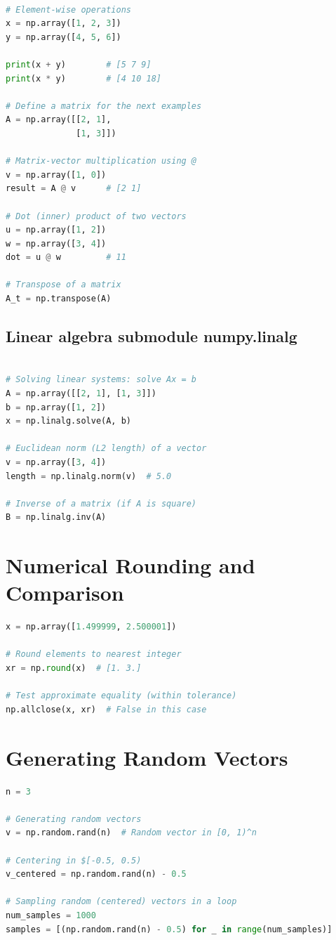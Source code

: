 \documentclass{article}
\begin{document}
\begin{lstlisting}[language=Python]

# Element-wise operations
x = np.array([1, 2, 3])
y = np.array([4, 5, 6])

print(x + y)        # [5 7 9]
print(x * y)        # [4 10 18]

# Define a matrix for the next examples
A = np.array([[2, 1], 
              [1, 3]])

# Matrix-vector multiplication using @
v = np.array([1, 0])
result = A @ v      # [2 1]

# Dot (inner) product of two vectors
u = np.array([1, 2])
w = np.array([3, 4])
dot = u @ w         # 11

# Transpose of a matrix
A_t = np.transpose(A)

\end{lstlisting}


\subsection*{Linear algebra submodule numpy.linalg}

\begin{lstlisting}[language=Python]

# Solving linear systems: solve Ax = b
A = np.array([[2, 1], [1, 3]])
b = np.array([1, 2])
x = np.linalg.solve(A, b)

# Euclidean norm (L2 length) of a vector
v = np.array([3, 4])
length = np.linalg.norm(v)  # 5.0

# Inverse of a matrix (if A is square)
B = np.linalg.inv(A)

\end{lstlisting}

\section{Numerical Rounding and Comparison}

\begin{lstlisting}[language=Python]
x = np.array([1.499999, 2.500001])

# Round elements to nearest integer
xr = np.round(x)  # [1. 3.]

# Test approximate equality (within tolerance)
np.allclose(x, xr)  # False in this case
\end{lstlisting}


\section{Generating Random Vectors}
\begin{lstlisting}[language=Python]
n = 3

# Generating random vectors
v = np.random.rand(n)  # Random vector in [0, 1)^n

# Centering in $[-0.5, 0.5)
v_centered = np.random.rand(n) - 0.5

# Sampling random (centered) vectors in a loop
num_samples = 1000
samples = [(np.random.rand(n) - 0.5) for _ in range(num_samples)]
\end{lstlisting}
\end{document}

